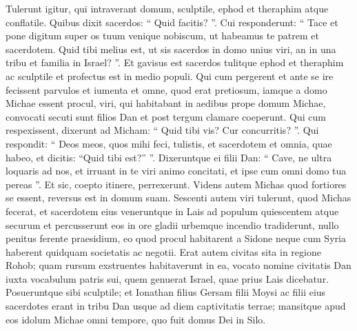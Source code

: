 \begin{biblechapter}
\begin{biblechapter}
\begin{biblechapter}
\begin{biblechapter}
\begin{biblechapter}
\begin{biblechapter}
\begin{biblechapter}
\begin{biblechapter}
\begin{biblechapter}
\begin{biblechapter}
\begin{biblechapter}
\begin{biblechapter}
\begin{biblechapter}
\begin{biblechapter}
\begin{biblechapter}
\begin{biblechapter}
\begin{biblechapter}
\begin{biblechapter}
 \verse Tulerunt igitur, qui intraverant domum, sculptile, ephod et theraphim atque conflatile. Quibus dixit sacerdos: “ Quid facitis? ”. 
\verse Cui responderunt: “ Tace et pone digitum super os tuum venique nobiscum, ut habeamus te patrem et sacerdotem. Quid tibi melius est, ut sis sacerdos in domo unius viri, an in una tribu et familia in Israel? ”. 
\verse Et gavisus est sacerdos tulitque ephod et theraphim ac sculptile et profectus est in medio populi.
 \verse Qui cum pergerent et ante se ire fecissent parvulos et iumenta et omne, quod erat pretiosum, 
\verse iamque a domo Michae essent procul, viri, qui habitabant in aedibus prope domum Michae, convocati secuti sunt filios Dan 
\verse et post tergum clamare coeperunt. Qui cum respexissent, dixerunt ad Micham: “ Quid tibi vis? Cur concurritis? ”. 
\verse Qui respondit: “ Deos meos, quos mihi feci, tulistis, et sacerdotem et omnia, quae habeo, et dicitis: “Quid tibi est?” ”. 
 \verse Dixeruntque ei filii Dan: “ Cave, ne ultra loquaris ad nos, et irruant in te viri animo concitati, et ipse cum omni domo tua pereas ”. 
\verse Et sic, coepto itinere, perrexerunt. Videns autem Michas quod fortiores se essent, reversus est in domum suam.
 \verse Sescenti autem viri tulerunt, quod Michas fecerat, et sacerdotem eius veneruntque in Lais ad populum quiescentem atque securum et percusserunt eos in ore gladii urbemque incendio tradiderunt, 
\verse nullo penitus ferente praesidium, eo quod procul habitarent a Sidone neque cum Syria haberent quidquam societatis ac negotii.
 Erat autem civitas sita in regione Rohob; quam rursum exstruentes habitaverunt in ea, 
\verse vocato nomine civitatis Dan iuxta vocabulum patris sui, quem genuerat Israel, quae prius Lais dicebatur. 
\verse Posueruntque sibi sculptile; et Ionathan filius Gersam filii Moysi ac filii eius sacerdotes erant in tribu Dan usque ad diem captivitatis terrae; 
\verse mansitque apud eos idolum Michae omni tempore, quo fuit domus Dei in Silo.
 

\end{biblechapter}
\end{biblechapter}
\end{biblechapter}
\end{biblechapter}
\end{biblechapter}
\end{biblechapter}
\end{biblechapter}
\end{biblechapter}
\end{biblechapter}
\end{biblechapter}
\end{biblechapter}
\end{biblechapter}
\end{biblechapter}
\end{biblechapter}
\end{biblechapter}
\end{biblechapter}
\end{biblechapter}
\end{biblechapter}

